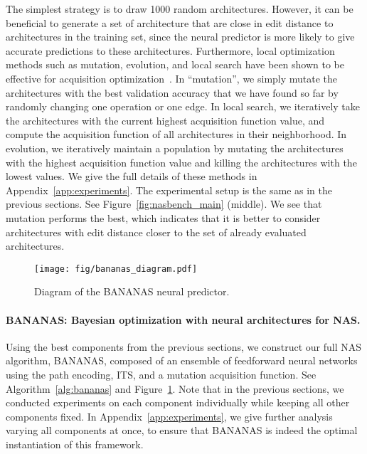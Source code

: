 \documentclass[11pt]{article}
\numberwithin{equation}{section}
\numberwithin{figure}{section}
\theoremstyle{plain}
\theoremstyle{definition}
\let\citep\cite
\begin{document}
The simplest strategy is to draw 1000 random architectures.
However, it can be beneficial to generate a set of architecture that are close in
edit distance to architectures in the training set, since the neural predictor is
more likely to give accurate predictions to these architectures.
Furthermore, local optimization methods such as mutation, evolution, and local
search have been shown to be effective for acquisition 
optimization~\citep{balandat2019botorch, nasbot, wilson2018maximizing}.
In ``mutation'', we simply mutate the architectures
with the best validation accuracy that we have found so far by randomly changing
one operation or one edge.
In local search, we iteratively take the architectures with the current highest
acquisition function value, and compute the acquisition function of all 
architectures in their neighborhood.
In evolution, we iteratively maintain a population by mutating the architectures
with the highest acquisition function value and killing the architectures with the
lowest values.
We give the full details of these methods in 
Appendix~\ref{app:experiments}.
The experimental setup is the same as in the previous sections.
See Figure~\ref{fig:nasbench_main} (middle).  
We see that mutation performs the best, which indicates that it is better to consider
architectures with edit distance closer to the set of already evaluated architectures.




\begin{figure}
\centering
    \texttt{[image: fig/bananas\_diagram.pdf]}
    \caption{Diagram of the BANANAS neural predictor.}
    \label{fig:bananas_diagram}
\end{figure}

\paragraph{BANANAS: Bayesian optimization with neural architectures for NAS.}
Using the best components from the previous sections, we construct our full NAS algorithm,
BANANAS, composed of an ensemble of feedforward neural networks using the path encoding,
ITS, and a mutation acquisition function.
See Algorithm~\ref{alg:bananas} and Figure~\ref{fig:bananas_diagram}.
Note that in the previous sections, we conducted experiments on each component
individually while keeping all other components fixed.
In Appendix~\ref{app:experiments},
we give further analysis varying all components at
once, to ensure that BANANAS is indeed the optimal instantiation of this framework. 
\end{document}
